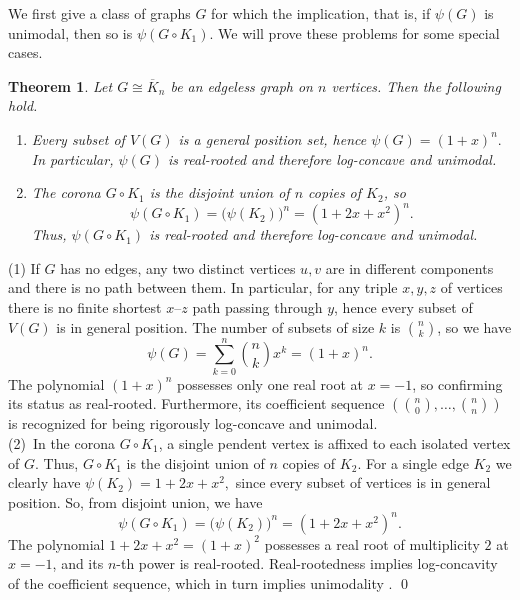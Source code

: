 \documentclass[12pt,twoside]{article}
\newtheorem{theorem}{Theorem}[section]
\renewenvironment{proof}{{\noindent\bfseries Proof.}}{\qed}
\begin{document}
	We first give a class of graphs $G$ for which the implication, that is, if  $\psi(G)$ is unimodal, then so is $\psi(G\circ K_1)$.  We will prove these problems for some special cases. 
	
	\begin{theorem}\label{thm:corona-edgeless}
		Let $G\cong \overline{K}_n$ be an edgeless graph on $n$ vertices. Then the following hold.
		\begin{enumerate}
			\item Every subset of $V(G)$ is a general position set, hence $\psi(G) = (1+x)^n.$ In particular, $\psi(G)$ is real-rooted and therefore log-concave and unimodal.
			
			\item The corona $G\circ K_1$ is the disjoint union of $n$ copies of
			$K_2$, so
			\[
			\psi(G\circ K_1) = \bigl(\psi(K_2)\bigr)^n = (1+2x+x^2)^n.
			\]
			Thus, $\psi(G\circ K_1)$ is real-rooted and therefore log-concave and unimodal.
		\end{enumerate}
	\end{theorem}
	
	\begin{proof}
		(1) If $G$ has no edges, any two distinct vertices $u,v$ are in different
		components and there is no path between them. In particular, for any triple
		$x,y,z$ of vertices there is no finite shortest $x$--$z$ path passing through
		$y$, hence every subset of $V(G)$ is in general position. The number of
		subsets of size $k$ is $\binom{n}{k}$, so we have
		\[
		\psi(G) = \sum_{k=0}^n \binom{n}{k}x^k = (1+x)^n.
		\]
		The polynomial $(1+x)^n$ possesses only one real root at $x=-1$, so confirming its status as real-rooted. Furthermore, its coefficient sequence $\left (\binom{n}{0},\dots,\binom{n}{n}\right )$ is recognized for being rigorously log-concave and unimodal.\\ (2) In the corona $G \circ K_1$, a single pendent vertex is affixed to each isolated vertex of $G$. Thus, $G\circ K_1$ is the disjoint union of $n$ copies of $K_2$.
		For a single edge $K_2$ we clearly have $\psi(K_2) = 1 + 2x + x^2,$ since every subset of vertices is in general position. So, from  disjoint union, we have
		\[
		\psi(G\circ K_1) = \bigl(\psi(K_2)\bigr)^n = (1+2x+x^2)^n.
		\]
		The polynomial \(1+2x+x^2 = (1+x)^2\) possesses a real root of multiplicity \(2\) at \(x=-1\), and its \(n\)-th power is real-rooted. Real-rootedness implies	log-concavity of the coefficient sequence, which in turn implies unimodality \cite{hardy}.
	\end{proof}
	
\end{document}
